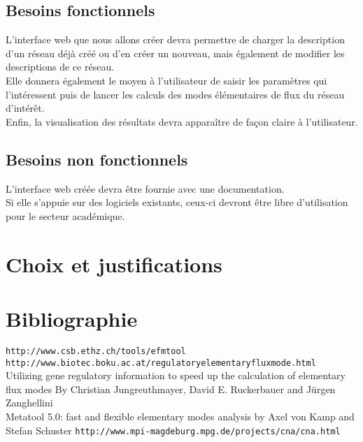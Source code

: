 \documentclass[12pt,a4paper]{report}
\begin{document}
\section{Besoins fonctionnels}

\noindent L'interface web que nous allons créer devra permettre de charger la description d'un réseau déjà créé ou d'en créer un nouveau, mais également de modifier les descriptions de ce réseau.\\
Elle donnera également le moyen à l'utilisateur de saisir les paramètres qui l'intéressent puis de lancer les calculs des modes élémentaires de flux du réseau d'intérêt.\\
Enfin, la visualisation des résultats devra apparaître de façon claire à l'utilisateur.

\section{Besoins non fonctionnels}

\noindent L'interface web créée devra être fournie avec une documentation.\\
Si elle s'appuie sur des logiciels existants, ceux-ci devront être libre d'utilisation pour le secteur académique.

\chapter{Choix et justifications}

\chapter*{Bibliographie}

\texttt{http://www.csb.ethz.ch/tools/efmtool}\\
\texttt{http://www.biotec.boku.ac.at/regulatoryelementaryfluxmode.html}\\
Utilizing gene regulatory information to speed up the calculation of elementary flux modes By Christian Jungreuthmayer, David E. Ruckerbauer and Jürgen Zanghellini\\
Metatool 5.0: fast and flexible elementary modes analysis by Axel von Kamp and Stefan Schuster
\texttt{http://www.mpi-magdeburg.mpg.de/projects/cna/cna.html}

\end{document}
